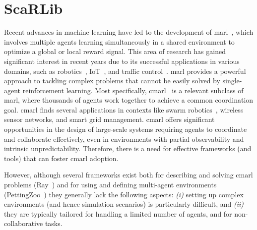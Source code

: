 %

%
%


\lstset{language=scafi}
%
%
\chapter{ScaRLib}%
%
\minitoc%
\newcommand{\meta}[1]{{\color{blue} #1}}%
\newcommand{\scarlib}{ScaRLib}
%
\acresetall
Recent advances in machine learning 
 have led to the development of \ac{marl}~\cite{Busoniu2008}, 
 which involves multiple agents learning simultaneously 
 in a shared environment to optimize a global or local reward signal. 
% 
This area of research has gained significant interest in recent years 
 due to its successful applications in various domains, 
 such as robotics~\cite{Long2018}, IoT~\cite{Lei2020}, and traffic control~\cite{https://doi.org/10.48550/arxiv.1903.04527}. 
%
\ac{marl} provides a powerful approach to tackling complex problems 
 that cannot be easily solved by single-agent reinforcement learning. 
%
Most specifically, \ac{cmarl}~\cite{yang2021many,https://doi.org/10.48550/arxiv.2106.09825}
 is a relevant subclass of \ac{marl}, 
 where thousands of agents work together to achieve a common coordination goal. 
\ac{cmarl} finds several applications in contexts like swarm robotics~\cite{huttenrauch2019deep}, wireless sensor networks, and smart grid management. 
%
\ac{cmarl} offers significant opportunities in the design of large-scale systems
 requiring agents to coordinate and collaborate effectively, 
 even in environments with partial observability and intrinsic unpredictability. 
%
Therefore, there is a need for effective frameworks (and tools) that can foster \ac{cmarl} adoption.

% 
However, although several frameworks exist both for describing and solving \ac{cmarl} problems (Ray~\cite{ray}) 
and for using and defining multi-agent environments (PettingZoo~\cite{NEURIPS2021_7ed2d345}) 
they generally lack the following aspects: \emph{(i)} setting up complex environments (and hence simulation scenarios) is particularly difficult, and 
\emph{(ii)} they are typically tailored for handling a limited number of agents, and for non-collaborative tasks.

